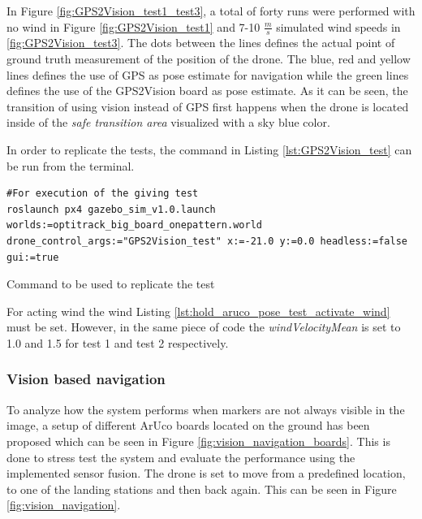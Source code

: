 \documentclass[../Head/report.tex]{subfiles}
\begin{document}
In Figure \ref{fig:GPS2Vision_test1_test3}, a total of forty runs were performed with no wind in Figure \ref{fig:GPS2Vision_test1} and 7-10 $\frac{m}{s}$ simulated wind speeds in \ref{fig:GPS2Vision_test3}. The dots between the lines defines the actual point of ground truth measurement of the position of the drone. The blue, red and yellow lines defines the use of GPS as pose estimate for navigation while the green lines defines the use of the GPS2Vision board as pose estimate. As it can be seen, the
transition of using vision instead of GPS first happens when the drone is located inside of the \textit{safe transition area} visualized with a sky blue color. 

In order to replicate the tests, the command in Listing \ref{lst:GPS2Vision_test} can be run from the terminal.

\begin{listing}[H] 
\begin{tcolorbox}[
    enhanced,
    attach boxed title to top left={xshift=6mm,yshift=-3mm},
    colback=lightgreen!20,
    colframe=lightgreen,
    fonttitle=\bfseries\color{black},
]
\begin{verbatim}
#For execution of the giving test
roslaunch px4 gazebo_sim_v1.0.launch worlds:=optitrack_big_board_onepattern.world drone_control_args:="GPS2Vision_test" x:=-21.0 y:=0.0 headless:=false gui:=true
\end{verbatim}
\end{tcolorbox}
\caption{Command to be used to replicate the test}
\label{lst:GPS2Vision_test}    
\end{listing} 

For acting wind the wind Listing \ref{lst:hold_aruco_pose_test_activate_wind} must be set. However, in the same piece of code the \textit{windVelocityMean} is set to 1.0 and 1.5 for test 1 and test 2 respectively. 

\subsubsection{Vision based navigation}
\label{sec:vision_based_navigation}

To analyze how the system performs when markers are not always visible in the image, a setup of different ArUco boards located on the ground has been proposed which can be seen in Figure \ref{fig:vision_navigation_boards}. This is done to stress test the system and evaluate the performance using the implemented sensor fusion. The drone is set to move from a predefined location, to one of the landing stations and then back again. This can be seen in Figure \ref{fig:vision_navigation}.  
\end{document}
